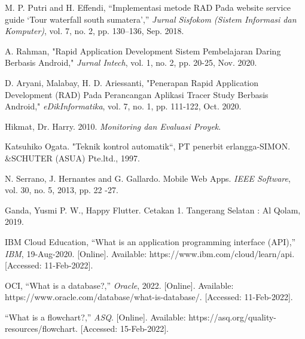 \begin{thebibliography}{7}
M. P. Putri and H. Effendi, “Implementasi metode RAD Pada website  service guide ‘Tour waterfall south sumatera’,” \emph{Jurnal Sisfokom (Sistem Informasi dan Komputer)}, vol. 7, no. 2, pp. 130–136, Sep. 2018. 

A. Rahman, "Rapid Application Development Sistem Pembelajaran Daring Berbasis Android," \emph{Jurnal Intech}, vol. 1, no. 2, pp. 20-25, Nov. 2020.

D. Aryani, Malabay, H. D. Ariessanti, "Penerapan Rapid Application Development (RAD) Pada Perancangan Aplikasi Tracer Study Berbasis Android," \emph{eDikInformatika}, vol. 7, no. 1, pp. 111-122, Oct. 2020.

Hikmat, Dr. Harry. 2010. \emph{Monitoring dan Evaluasi Proyek}.

Katsuhiko Ogata. "Teknik kontrol automatik“, PT penerbit erlangga-SIMON. \&SCHUTER (ASUA) Pte.ltd., 1997.

N. Serrano, J. Hernantes and G. Gallardo. Mobile Web Apps. \emph{IEEE Software}, vol. 30, no. 5, 2013, pp. 22 -27.

Ganda, Yusmi P. W., Happy Flutter. Cetakan 1. Tangerang Selatan : Al Qolam, 2019.

IBM Cloud Education, “What is an application programming interface (API),” \emph{IBM}, 19-Aug-2020. [Online]. Available: https://www.ibm.com/cloud/learn/api. [Accessed: 11-Feb-2022]. 

OCI, “What is a database?,” \emph{Oracle}, 2022. [Online]. Available: https://www.oracle.com/database/what-is-database/. [Accessed: 11-Feb-2022]. 

“What is a flowchart?,” \emph{ASQ}. [Online]. Available: https://asq.org/quality-resources/flowchart. [Accessed: 15-Feb-2022]. 


\end{thebibliography}
